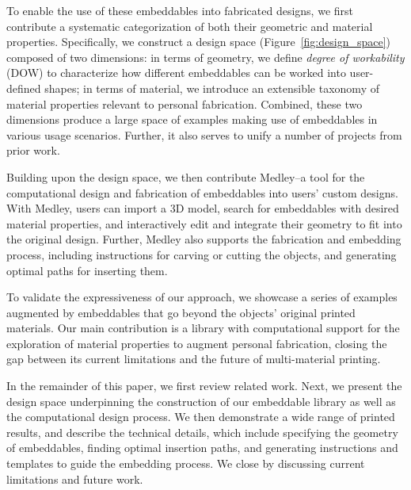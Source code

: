 To enable the use of these embeddables into fabricated designs, we first contribute a systematic categorization of both their geometric and material properties. Specifically, we construct a design space (Figure~\ref{fig:design_space}) composed of two dimensions: in terms of geometry, we define \textit{degree of workability} (DOW) to characterize how different embeddables can be worked into user-defined shapes; in terms of material, we introduce an extensible taxonomy of material properties relevant to personal fabrication. Combined, these two dimensions produce a large space of examples making use of embeddables in various usage scenarios. Further, it also serves to unify a number of projects from prior work.

Building upon the design space, we then contribute Medley--a tool for the computational design and fabrication of embeddables into users' custom designs. With Medley, users can import a 3D model, search for embeddables with desired material properties, and interactively edit and integrate their geometry to fit into the original design. Further, Medley also supports the fabrication and embedding process, including instructions for carving or cutting the objects, and generating optimal paths for inserting them.

To validate the expressiveness of our approach, we showcase a series of examples augmented by embeddables that go beyond the objects' original printed materials. Our main contribution is a library with computational support for the exploration of material properties to augment personal fabrication, closing the gap between its current limitations and the future of multi-material printing.
	
In the remainder of this paper, we first review related work. Next, we present the design space underpinning the construction of our embeddable library as well as the computational design process. We then demonstrate a wide range of printed results, and describe the technical details, which include specifying the geometry of embeddables, finding optimal insertion paths, and generating instructions and templates to guide the embedding process. We close by discussing current limitations and future work.

